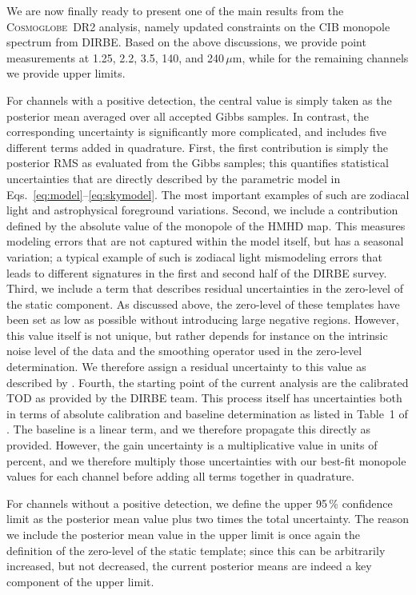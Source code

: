 \documentclass{aa}
\newcommand{\cosmoglobe}{\textsc{Cosmoglobe}}
\begin{document}
We are now finally ready to present one of the main results from the
\cosmoglobe\ DR2 analysis, namely updated constraints on the CIB
monopole spectrum from DIRBE. Based on the above discussions, we
provide point measurements at 1.25, 2.2, 3.5, 140, and
240$\,\mu\mathrm{m}$, while for the remaining channels we provide
upper limits.

For channels with a positive detection, the central value is simply
taken as the posterior mean averaged over all accepted Gibbs
samples. In contrast, the corresponding uncertainty is significantly
more complicated, and includes five different terms added in
quadrature. First, the first contribution is simply the posterior
RMS as evaluated from the Gibbs samples; this quantifies statistical
uncertainties that are directly described by the parametric model in
Eqs.~\eqref{eq:model}--\eqref{eq:skymodel}. The most important
examples of such are zodiacal light and astrophysical foreground
variations. Second, we include a contribution defined by the
absolute value of the monopole of the HMHD map. This measures
modeling errors that are not captured within the model itself, but
has a seasonal variation; a typical example of such is zodiacal light
mismodeling errors that leads to different signatures in the first
and second half of the DIRBE survey. Third, we include a term that
describes residual uncertainties in the zero-level of the static
component. As discussed above, the zero-level of these templates have
been set as low as possible without introducing large negative
regions. However, this value itself is not unique, but rather depends
for instance on the intrinsic noise level of the data and the
smoothing operator used in the zero-level determination. We therefore
assign a residual uncertainty to this value as described by
\citet{CG02_01}. Fourth, the starting point of the current analysis
are the calibrated TOD as provided by the DIRBE team. This process
itself has uncertainties both in terms of absolute calibration and
baseline determination as listed in Table~1 of \citet{hauser1998}. The
baseline is a linear term, and we therefore propagate this directly as
provided. However, the gain uncertainty is a multiplicative value in
units of percent, and we therefore multiply those uncertainties with
our best-fit monopole values for each channel before adding
all terms together in quadrature.


For channels without a positive detection, we define the upper 95\,\%
confidence limit as the posterior mean value plus two times the total
uncertainty. The reason we include the posterior mean value in the
upper limit is once again the definition of the zero-level of the
static template; since this can be arbitrarily increased, but not
decreased, the current posterior means are indeed a key component of
the upper limit.
\end{document}
